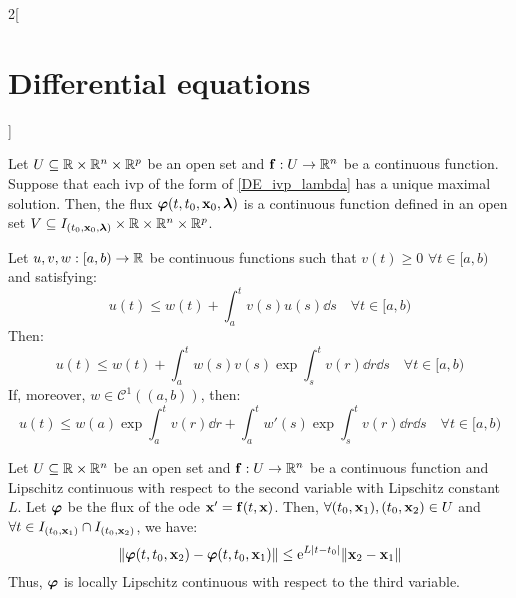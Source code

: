 \documentclass[../../../main.tex]{subfiles}
\begin{document}
\begin{multicols}{2}[\section{Differential equations}]
\begin{theorem}
    Let $U\subseteq\mathbb{R}\times\mathbb{R}^n\times\mathbb{R}^p$ be an open set and $\boldsymbol{\mathrm{f}}:U\rightarrow\mathbb{R}^n$ be a continuous function. Suppose that each ivp of the form of \eqref{DE_ivp_lambda} has a unique maximal solution. Then, the flux $\boldsymbol{\mathrm{\varphi}}(t,t_0,\boldsymbol{\mathrm{x}}_0,\boldsymbol{\mathrm{\lambda}})$ is a continuous function defined in an open set $V\subseteq I_{(t_0,\boldsymbol{\mathrm{x}}_0,\boldsymbol{\mathrm{\lambda}})}\times\mathbb{R}\times\mathbb{R}^n\times\mathbb{R}^p$.
  \end{theorem}
  \begin{lemma}
    Let $u,v,w:[a,b)\rightarrow\mathbb{R}$ be continuous functions such that $v(t)\geq 0$ $\forall t\in[a,b)$ and satisfying: $$u(t)\leq w(t)+\int_a^tv(s)u(s)\dd s\quad\forall t\in[a,b)$$
    Then: $$u(t)\leq w(t)+\int_a^tw(s)v(s)\exp{\int_s^tv(r)\dd r}\dd s\quad\forall t\in[a,b)$$
    If, moreover, $w\in\mathcal{C}^1((a,b))$, then: $$u(t)\leq w(a)\exp{\int_a^tv(r)\dd r}+\int_a^tw'(s)\exp{\int_s^tv(r)\dd r}\dd s\quad\forall t\in[a,b)$$
  \end{lemma}
  \begin{prop}
    Let $U\subseteq\mathbb{R}\times\mathbb{R}^n$ be an open set and $\boldsymbol{\mathrm{f}}:U\rightarrow\mathbb{R}^n$ be a continuous function and Lipschitz continuous with respect to the second variable with Lipschitz constant $L$. Let $\boldsymbol{\mathrm{\varphi}}$ be the flux of the ode $\boldsymbol{\mathrm{x}}'=\boldsymbol{\mathrm{f}}(t,\boldsymbol{\mathrm{x}})$. Then, $\forall (t_0,\boldsymbol{\mathrm{x}}_1),(t_0,\boldsymbol{\mathrm{x}}_2)\in U$ and $\forall t\in I_{(t_0,\boldsymbol{\mathrm{x}}_1)}\cap I_{(t_0,\boldsymbol{\mathrm{x}}_2)}$, we have:
    $$\|\boldsymbol{\mathrm{\varphi}}(t,t_0,\boldsymbol{\mathrm{x}}_2)-\boldsymbol{\mathrm{\varphi}}(t,t_0,\boldsymbol{\mathrm{x}}_1)\|\leq\mathrm{e}^{L|t-t_0|}\|\boldsymbol{\mathrm{x}}_2-\boldsymbol{\mathrm{x}}_1\|$$
    Thus, $\boldsymbol{\mathrm{\varphi}}$ is locally Lipschitz continuous with respect to the third variable.
  \end{prop}

\end{multicols}
\end{document}
